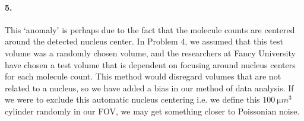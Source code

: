 \documentclass[../main.tex]{subfiles}
\begin{document}
\paragraph*{5.} This `anomaly' is perhaps due to the fact that the molecule counts are centered 
around the detected nucleus center. In Problem 4, we assumed that this test volume
was a randomly chosen volume, and the researchers at Fancy University have chosen a test volume that
is dependent on focusing around nucleus centers for each molecule count. This method would disregard
volumes that are not related to a nucleus, so we have added a bias in our method of data analysis. 
If we were to exclude this automatic nucleus centering i.e. we define this $\qty{100}{\micro m^3}$
cylinder randomly in our FOV, we may get something closer to Poissonian noise.
\end{document}
